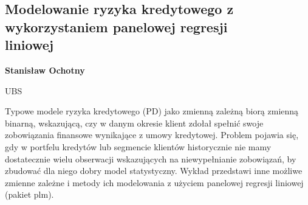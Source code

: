 \documentclass[\main/boa.tex]{subfiles}
\begin{document}
\subsection{ Modelowanie ryzyka kredytowego z wykorzystaniem panelowej regresji\\ liniowej}

\begin{minipage}{0.915\textwidth}
	\centering
  {\bf {} Stanisław Ochotny}
\end{minipage}


\begin{affiliations}
\begin{minipage}{0.915\textwidth}
\centering
UBS \\[-2pt]
\end{minipage}
\end{affiliations}

\vskip 0.3cm

Typowe modele ryzyka kredytowego (PD) jako zmienną zależną biorą zmienną binarną, wskazującą, czy w danym okresie klient zdołał spełnić swoje zobowiązania finansowe wynikające z umowy kredytowej. Problem pojawia się, gdy w portfelu kredytów lub segmencie klientów historycznie nie mamy dostatecznie wielu obserwacji wskazujących na niewypełnianie zobowiązań, by zbudować dla niego dobry model statystyczny. Wykład przedstawi inne możliwe zmienne zależne i metody ich modelowania z użyciem panelowej regresji liniowej (pakiet plm).
\end{document}
